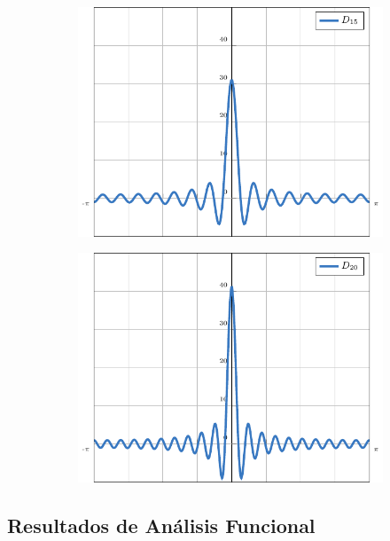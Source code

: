 \documentclass{beamer}
\begin{document}
\begin{frame}
\begin{figure}[H]
\begin{subfigure}[b]{0.49\textwidth}
        \includegraphics[scale = 0.49]{plot3/main.pdf}
    \end{subfigure}
    \begin{subfigure}[b]{0.49\textwidth}
        \centering
        \includegraphics[scale = 0.49]{plot4/main.pdf}
    \end{subfigure}
    \end{figure}
\end{frame}

\subsection{Resultados de Análisis Funcional}
\end{document}
